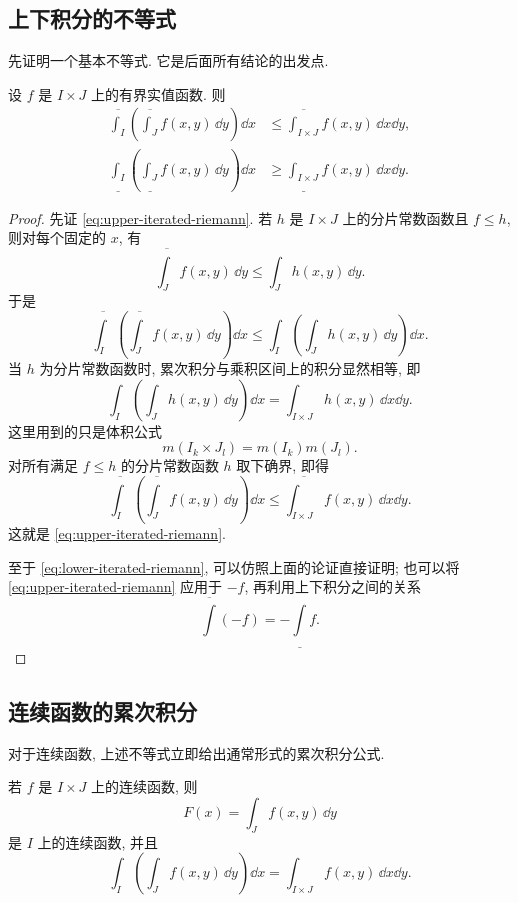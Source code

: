 \subsection{上下积分的不等式}

先证明一个基本不等式. 它是后面所有结论的出发点.

\begin{prop}\label{prop:upper-lower-iterated-riemann}
	设 \(f\) 是 \(I\times J\) 上的有界实值函数. 则
	\begin{align}
		\overline{\int_I}\left(\overline{\int_J}f(x,y)\,\dd y\right)\dd x
		&\leq
		\overline{\int_{I\times J}} f(x,y)\,\dd x\dd y,\label{eq:upper-iterated-riemann}\\
		\underline{\int_I}\left(\underline{\int_J}f(x,y)\,\dd y\right)\dd x
		&\geq
		\underline{\int_{I\times J}} f(x,y)\,\dd x\dd y.\label{eq:lower-iterated-riemann}
	\end{align}
\end{prop}

\begin{proof}
	先证 \eqref{eq:upper-iterated-riemann}. 若 \(h\) 是 \(I\times J\) 上的分片常数函数且 \(f\leq h\), 则对每个固定的 \(x\), 有
	\[
	\overline{\int_J}f(x,y)\,\dd y
	\leq
	\int_J h(x,y)\,\dd y.
	\]
	于是
	\[
	\overline{\int_I}\left(\overline{\int_J}f(x,y)\,\dd y\right)\dd x
	\leq
	\int_I\left(\int_J h(x,y)\,\dd y\right)\dd x.
	\]
	当 \(h\) 为分片常数函数时, 累次积分与乘积区间上的积分显然相等, 即
	\[
	\int_I\left(\int_J h(x,y)\,\dd y\right)\dd x
	=
	\int_{I\times J}h(x,y)\,\dd x\dd y.
	\]
	这里用到的只是体积公式
	\[
	m(I_k\times J_l)=m(I_k)m(J_l).
	\]
	对所有满足 \(f\leq h\) 的分片常数函数 \(h\) 取下确界, 即得
	\[
	\overline{\int_I}\left(\overline{\int_J}f(x,y)\,\dd y\right)\dd x
	\leq
	\overline{\int_{I\times J}} f(x,y)\,\dd x\dd y.
	\]
	这就是 \eqref{eq:upper-iterated-riemann}.
	
	至于 \eqref{eq:lower-iterated-riemann}, 可以仿照上面的论证直接证明; 也可以将 \eqref{eq:upper-iterated-riemann} 应用于 \(-f\), 再利用上下积分之间的关系
	\[
	\overline{\int}(-f)=-\underline{\int}f.
	\]
\end{proof}

\subsection{连续函数的累次积分}

对于连续函数, 上述不等式立即给出通常形式的累次积分公式.

\begin{thm}[连续函数的累次积分]\label{thm:continuous-fubini-riemann}
	若 \(f\) 是 \(I\times J\) 上的连续函数, 则
	\[
	F(x)=\int_J f(x,y)\,\dd y
	\]
	是 \(I\) 上的连续函数, 并且
	\[
	\int_I\left(\int_J f(x,y)\,\dd y\right)\dd x
	=
	\int_{I\times J}f(x,y)\,\dd x\dd y.
	\]
\end{thm}

